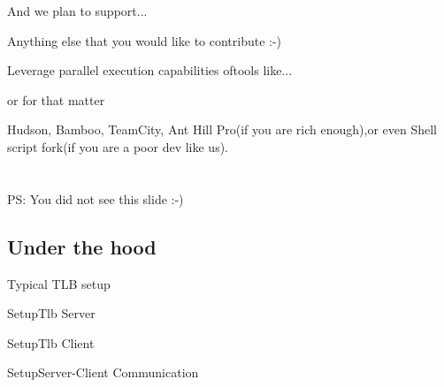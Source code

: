 \documentclass{beamer}
\begin{document}
\begin{frame}{And we plan to support...}
  \begin{center}
    Anything else that you would like to contribute :-)
  \end{center}
\end{frame}

\begin{frame}{Leverage parallel execution capabilities of}{tools like...}
  \begin{center}
  \end{center}
\end{frame}

\begin{frame}{or for that matter}
  \begin{center}
    {\huge Hudson, Bamboo, TeamCity, Ant Hill Pro}(if you are rich enough),{\huge or even Shell script fork}(if you are a poor dev like us).\\
    \quad\\\quad\\
    {\footnotesize PS: You did not see this slide :-)}
  \end{center}
\end{frame}

\subsection{Under the hood}

\begin{frame}{Typical TLB setup}
  \begin{centering}
  \end{centering}
\end{frame}

\begin{frame}{Setup}{Tlb Server}
  \begin{centering}
  \end{centering}
\end{frame}

\begin{frame}{Setup}{Tlb Client}
  \begin{centering}
  \end{centering}
\end{frame}

\begin{frame}{Setup}{Server-Client Communication}
  \begin{centering}
  \end{centering}
\end{frame}
\end{document}
